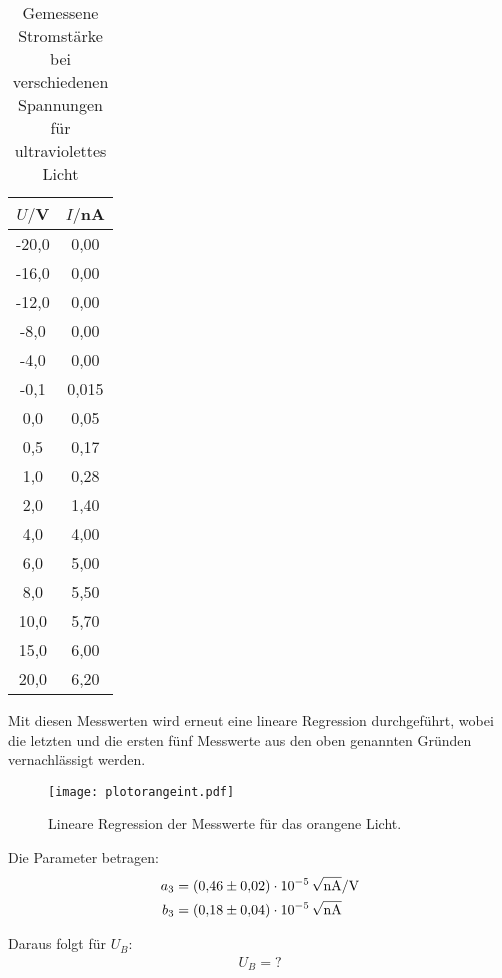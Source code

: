 \begin{table}[H]
  \centering
  \caption{Gemessene Stromstärke bei verschiedenen Spannungen für ultraviolettes Licht}
  \label{tab:Spannungsamplitude}
  \begin{tabular}{c c}
    \toprule
    $U/$V & $I/$nA \\
    \midrule
    -20,0 &	0,00 \\
    -16,0 &	0,00 \\
    -12,0 &	0,00 \\
    -8,0 &	0,00\\
    -4,0 &	0,00 \\
    -0,1   &  0,015 \\
    0,0	 &  0,05 \\
    0,5	 &  0,17\\
    1,0	 &  0,28 \\
    2,0  &  1,40 \\
    4,0  &  4,00 \\
    6,0  &  5,00 \\
    8,0  &  5,50 \\
    10,0 &  5,70 \\
    15,0  & 6,00 \\
    20,0  & 6,20 \\
    \bottomrule
  \end{tabular}
\end{table}

Mit diesen Messwerten wird erneut eine lineare Regression durchgeführt, wobei die letzten  und die ersten fünf Messwerte
aus den oben genannten Gründen vernachlässigt werden.

\begin{figure}[H]
  \centering
  \texttt{[image: plotorangeint.pdf]}
  \caption{Lineare Regression der Messwerte für das orangene Licht.}
  \label{fig:plotorange}
\end{figure}

Die Parameter betragen:
\begin{align*}
  a_3 &= \SI{0.46(2)e-5}{\sqrt{\nano\ampere}\per\volt} \\
  b_3 &= \SI{0.18(4)e-5}{\sqrt{\nano\ampere}}
\end{align*}

Daraus folgt für $U_B$:
\begin{align*}
  U_B = ?
\end{align*}
